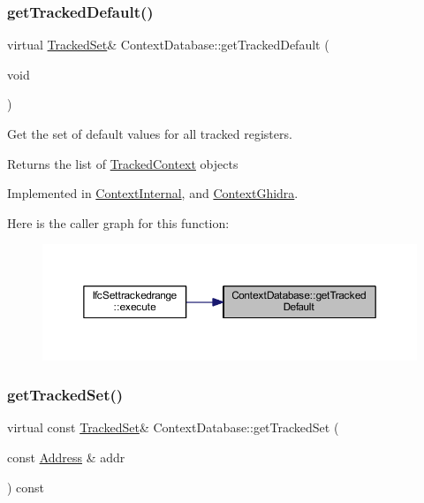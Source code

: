 \subsubsection{\texorpdfstring{getTrackedDefault()}{getTrackedDefault()}}
{\footnotesize\ttfamily virtual \mbox{\hyperlink{globalcontext_8hh_a7559d2c55c5d12fbbaf0418733b62438}{Tracked\+Set}}\& Context\+Database\+::get\+Tracked\+Default (\begin{DoxyParamCaption}\item[{void}]{ }\end{DoxyParamCaption})\hspace{0.3cm}{\ttfamily [pure virtual]}}



Get the set of default values for all tracked registers. 

\begin{DoxyReturn}{Returns}
the list of \mbox{\hyperlink{struct_tracked_context}{Tracked\+Context}} objects 
\end{DoxyReturn}


Implemented in \mbox{\hyperlink{class_context_internal_a38f6d0158f108dd29132250b1cb234b1}{Context\+Internal}}, and \mbox{\hyperlink{class_context_ghidra_a7eca09e7b7d72d65669b91e79e16971b}{Context\+Ghidra}}.

Here is the caller graph for this function\+:
\nopagebreak
\begin{figure}[H]
\begin{center}
\leavevmode
\includegraphics[width=350pt]{class_context_database_a08908cbaeb6c0a722e40f9392d9615bd_icgraph}
\end{center}
\end{figure}
\mbox{\label{class_context_database_a6ea1e4b793286c0b1ecbafcc58422339}} 
\subsubsection{\texorpdfstring{getTrackedSet()}{getTrackedSet()}}
{\footnotesize\ttfamily virtual const \mbox{\hyperlink{globalcontext_8hh_a7559d2c55c5d12fbbaf0418733b62438}{Tracked\+Set}}\& Context\+Database\+::get\+Tracked\+Set (\begin{DoxyParamCaption}\item[{const \mbox{\hyperlink{class_address}{Address}} \&}]{addr }\end{DoxyParamCaption}) const\hspace{0.3cm}{\ttfamily [pure virtual]}}




